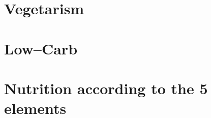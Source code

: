 \documentclass[../main.tex]{subfiles}
\begin{document}
\section{Vegetarism}



\section{Low--Carb}



\section{Nutrition according to the 5 elements}


\end{document}
